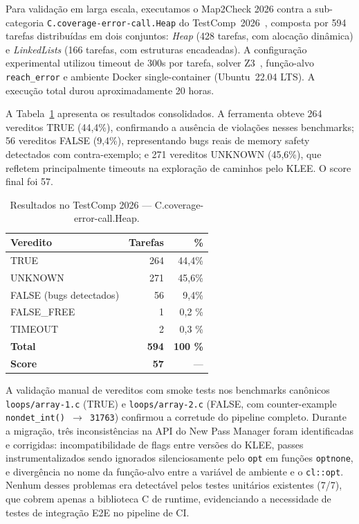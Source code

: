 \documentclass[12pt]{article}
\newcommand{\TotalTasks}{594}
\newcommand{\ScoreTestComp}{57}
\newcommand{\CountTrue}{264}
\newcommand{\CountUnknown}{271}
\newcommand{\CountFalse}{56}
\newcommand{\CountFalseFree}{1}
\newcommand{\CountTimeout}{2}
\newcommand{\PctTrue}{44,4}
\newcommand{\PctUnknown}{45,6}
\newcommand{\PctFalse}{9,4}
\newcommand{\UnitTests}{7/7}
\newcommand{\DockerBase}{Ubuntu~22.04}
\newcommand{\TimeoutVal}{300}
\begin{document}
Para validação em larga escala, executamos o Map2Check 2026 contra a sub-categoria \texttt{C.coverage-error-call.Heap} do TestComp~2026~\cite{beyertestcomp2023}, composta por \TotalTasks{} tarefas distribuídas em dois conjuntos: \textit{Heap} (428 tarefas, com alocação dinâmica) e \textit{LinkedLists} (166 tarefas, com estruturas encadeadas). A configuração experimental utilizou timeout de \TimeoutVal{}s por tarefa, solver Z3~\cite{z3esbmc2008}, função-alvo \texttt{reach\_error} e ambiente Docker single-container (\DockerBase{} LTS). A execução total durou aproximadamente 20 horas.

A Tabela~\ref{tab:testcomp} apresenta os resultados consolidados. A ferramenta obteve \CountTrue{} vereditos TRUE (\PctTrue\%), confirmando a ausência de violações nesses benchmarks; \CountFalse{} vereditos FALSE
(\PctFalse\%), representando bugs reais de memory safety detectados com contra-exemplo; e \CountUnknown{} vereditos UNKNOWN (\PctUnknown\%), que refletem principalmente timeouts na exploração de caminhos pelo KLEE. O
score final foi \ScoreTestComp{}.

\begin{table}[ht]
\centering
\caption{Resultados no TestComp 2026 --- C.coverage-error-call.Heap.}
\label{tab:testcomp}
\begin{tabular}{@{}lrr@{}}
\toprule
Veredito & Tarefas & \% \\
\midrule
TRUE & \CountTrue{} & \PctTrue \% \\
UNKNOWN & \CountUnknown{} & \PctUnknown \% \\
FALSE (bugs detectados) & \CountFalse{} & \PctFalse \% \\
FALSE\_FREE & \CountFalseFree{} & 0,2 \% \\
TIMEOUT & \CountTimeout{} & 0,3 \% \\
\midrule
\textbf{Total} & \textbf{\TotalTasks} & \textbf{100 \%} \\
\textbf{Score} & \textbf{\ScoreTestComp} & --- \\
\bottomrule
\end{tabular}
\end{table}

A validação manual de vereditos com smoke tests nos benchmarks canônicos \texttt{loops/array-1.c} (TRUE) e \texttt{loops/array-2.c} (FALSE, com counter-example \texttt{nondet\_int() $\rightarrow$ 31763}) confirmou a
corretude do pipeline completo. Durante a migração, três inconsistências na API do New Pass Manager foram identificadas e corrigidas: incompatibilidade de flags entre versões do KLEE, passes instrumentalizados sendo ignorados silenciosamente pelo \texttt{opt} em funções \texttt{optnone}, e divergência no nome da função-alvo entre a variável de ambiente e o \texttt{cl::opt}. Nenhum desses problemas era detectável pelos testes
unitários existentes (\UnitTests{}), que cobrem apenas a biblioteca C de runtime, evidenciando a necessidade de testes de integração E2E no pipeline de CI.
\end{document}
